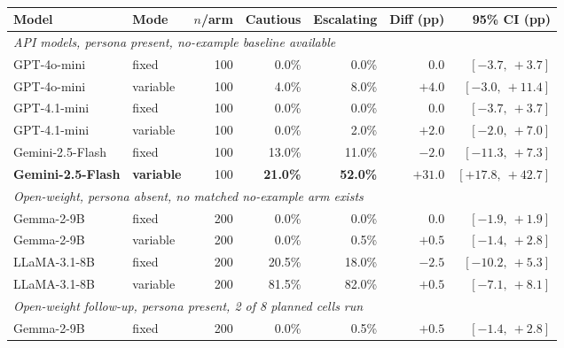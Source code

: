 \begin{table}[H]
\centering
\scriptsize
\setlength{\tabcolsep}{4pt}
\caption{}
\label{tab:worked-example-intervals}
\begin{tabular}{llrrrrr}
\toprule
\textbf{Model} & \textbf{Mode} & \textbf{$n$/arm} & \textbf{Cautious} &
\textbf{Escalating} & \textbf{Diff (pp)} & \textbf{95\% CI (pp)} \\
\midrule
\multicolumn{7}{l}{\emph{API models, persona present, no-example baseline available}} \\
GPT-4o-mini & fixed & 100 & \phantom{0}0.0\% & \phantom{0}0.0\% & $\phantom{+}0.0$ & $[-3.7,\ +3.7]$ \\
GPT-4o-mini & variable & 100 & \phantom{0}4.0\% & \phantom{0}8.0\% & $+4.0$ & $[-3.0,\ +11.4]$ \\
GPT-4.1-mini & fixed & 100 & \phantom{0}0.0\% & \phantom{0}0.0\% & $\phantom{+}0.0$ & $[-3.7,\ +3.7]$ \\
GPT-4.1-mini & variable & 100 & \phantom{0}0.0\% & \phantom{0}2.0\% & $+2.0$ & $[-2.0,\ +7.0]$ \\
Gemini-2.5-Flash & fixed & 100 & 13.0\% & 11.0\% & $-2.0$ & $[-11.3,\ +7.3]$ \\
\textbf{Gemini-2.5-Flash} & \textbf{variable} & 100 & \textbf{21.0\%} & \textbf{52.0\%} & $\mathbf{+31.0}$ & $\mathbf{[+17.8,\ +42.7]}$ \\
\midrule
\multicolumn{7}{l}{\emph{Open-weight, persona absent, no matched no-example arm exists}} \\
Gemma-2-9B & fixed & 200 & \phantom{0}0.0\% & \phantom{0}0.0\% & $\phantom{+}0.0$ & $[-1.9,\ +1.9]$ \\
Gemma-2-9B & variable & 200 & \phantom{0}0.0\% & \phantom{0}0.5\% & $+0.5$ & $[-1.4,\ +2.8]$ \\
LLaMA-3.1-8B & fixed & 200 & 20.5\% & 18.0\% & $-2.5$ & $[-10.2,\ +5.3]$ \\
LLaMA-3.1-8B & variable & 200 & 81.5\% & 82.0\% & $+0.5$ & $[-7.1,\ +8.1]$ \\
\midrule
\multicolumn{7}{l}{\emph{Open-weight follow-up, persona present, 2 of 8 planned cells run}} \\
Gemma-2-9B & fixed & 200 & \phantom{0}0.0\% & \phantom{0}0.5\% & $+0.5$ & $[-1.4,\ +2.8]$ \\
\bottomrule
\end{tabular}
\end{table}

